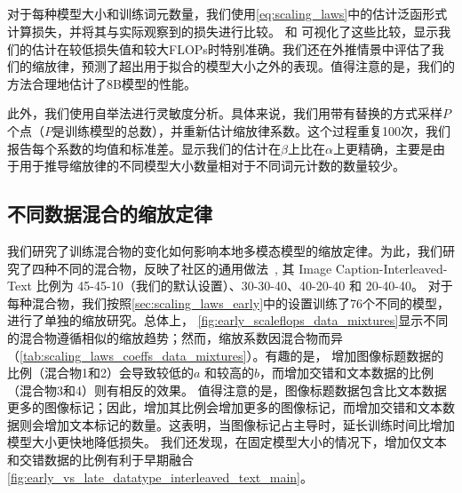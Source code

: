

    

\subsection{}
\label{sec:scaling_laws_evaluation}
对于每种模型大小和训练词元数量，我们使用\cref{eq:scaling_laws}中的估计泛函形式计算损失，并将其与实际观察到的损失进行比较。 和  可视化了这些比较，显示我们的估计在较低损失值和较大FLOPs时特别准确。我们还在外推情景中评估了我们的缩放律，预测了超出用于拟合的模型大小之外的表现。值得注意的是，我们的方法合理地估计了8B模型的性能。  

此外，我们使用自举法进行灵敏度分析。具体来说，我们用带有替换的方式采样\( P \)个点（\( P \)是训练模型的总数），并重新估计缩放律系数。这个过程重复100次，我们报告每个系数的均值和标准差。显示我们的估计在\(\beta\)上比在\(\alpha\)上更精确，主要是由于用于推导缩放律的不同模型大小数量相对于不同词元计数的数量较少。





\subsection{不同数据混合的缩放定律}
\label{sec:scaling_data_mix}
我们研究了训练混合物的变化如何影响本地多模态模型的缩放定律。为此，我们研究了四种不同的混合物，反映了社区的通用做法~\citep{laurenccon2024obelics,mckinzie2025mm1,zhang2024mm1_5,lin2024vila},
其 Image Caption-Interleaved-Text 比例为 \colorbox{blue!10}{45-45-10}（我们的默认设置）、\colorbox{red!10}{30-30-40}、\colorbox{green!10}{40-20-40} 和 \colorbox{orange!10}{20-40-40}。
对于每种混合物，我们按照\cref{sec:scaling_laws_early}中的设置训练了76个不同的模型，进行了单独的缩放研究。总体上，
\cref{fig:early_scaleflops_data_mixtures}显示不同的混合物遵循相似的缩放趋势；然而，缩放系数因混合物而异（\cref{tab:scaling_laws_coeffs_data_mixtures}）。有趣的是，
增加图像标题数据的比例（混合物1和2）会导致较低的$a$ 和较高的$b$，而增加交错和文本数据的比例（混合物3和4）则有相反的效果。
值得注意的是，图像标题数据包含比文本数据更多的图像标记；因此，增加其比例会增加更多的图像标记，而增加交错和文本数据则会增加文本标记的数量。这表明，当图像标记占主导时，延长训练时间比增加模型大小更快地降低损失。
我们还发现，在固定模型大小的情况下，增加仅文本和交错数据的比例有利于早期融合\cref{fig:early_vs_late_datatype_interleaved_text_main}。


























